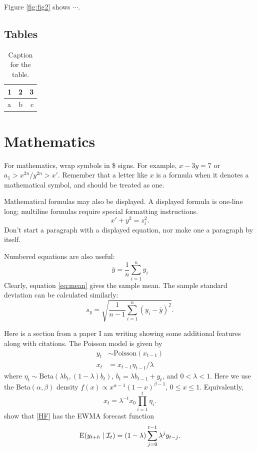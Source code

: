 \documentclass[a4paper,11pt]{article}
\newcommand{\info}{{\cal I}}
\newcommand{\E}{\text{E}}
\begin{document}
Figure \ref{fig:fig2} shows $\cdots$.

\subsection{Tables}

\begin{table}[h!]
  \centering
  \caption{Caption for the table.}
  \label{tab:table1}
  \begin{tabular}{l|c||r}
    \toprule
    1 & 2 & 3\\
    \hline
    a & b & c\\
    \bottomrule
  \end{tabular}
\end{table}

\section{Mathematics}

For mathematics, wrap symbols in \$ signs. For example, $x-3y=7$
or $a_{1} > x^{2n} / y^{2n} > x' $.
Remember that a letter like $x$ is a formula when it denotes a
mathematical symbol, and should be treated as one.

Mathematical formulas may also be displayed.  A displayed formula
is one-line long; multiline formulas require special formatting
instructions.
$$
  x' + y^{2} = z_{i}^{2}.
$$
Don't start a paragraph with a displayed equation, nor make one a
paragraph by itself.

Numbered equations are also useful:
\begin{equation}\label{eq:mean} 
         \bar{y} = \frac{1}{n} \sum_{i=1}^{n} y_i
\end{equation}
Clearly, equation \eqref{eq:mean} gives the sample mean.  The
sample standard deviation can be calculated similarly:
\begin{equation*}
        s_y = \sqrt{ \frac{1}{n-1} \sum\limits_{i=1}^n (y_i-\bar{y})^2 }.
\end{equation*}

Here \citet{SM86}  is a section from a paper I am writing showing some additional features along with citations. The Poisson model \citep{SM86} is given by
\begin{subequations}\label{HF}
\begin{align}
y_t   &\sim \text{Poisson}(x_{t-1}) \label{HF.1} \\
x_t &= x_{t-1} \eta_{t-1}/\lambda  \label{HF.2}
\end{align}
\end{subequations}
where $\eta_t \sim \text{Beta}(\lambda b_t,(1-\lambda) b_t)$, $b_t=\lambda b_{t-1}+y_t $, and $0<\lambda<1$.  Here we use the Beta$(\alpha,\beta)$ density $f(x) \propto x^{\alpha-1}(1-x)^{\beta-1}$, $0\le x\le1$. Equivalently,
\begin{equation}\label{prodeta}
x_t = \lambda^{-t}x_0\prod_{i=1}^t\eta_i.
\end{equation}
\citet{HF89} show that \eqref{HF} has the EWMA forecast function
\[
  \E(y_{t+h}\mid \info_t) = (1-\lambda)\sum_{j=0}^{t-1} \lambda^j y_{t-j}.
\]





\end{document}
